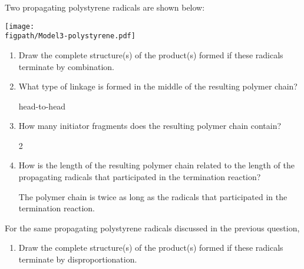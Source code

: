 \begin{activity}
\begin{ctqs}
	\question Two propagating polystyrene radicals are shown below:
	
			\centerline{\texttt{[image: \\figpath/Model3-polystyrene.pdf]}}
	
		\begin{enumerate}
			\item Draw the complete structure(s) of the product(s) formed if these radicals terminate by combination.
	
				\begin{solution}[1.25in]\end{solution}
			
			\item What type of linkage is formed in the middle of the resulting polymer chain?
	
				\begin{solution}[0.25in]
					head-to-head
				\end{solution}
			
			\item How many initiator fragments does the resulting polymer chain contain?
	
				\begin{solution}[0.25in]
					2
				\end{solution}
			
			\item How is the length of the resulting polymer chain related to the length of the propagating radicals that participated in the termination reaction?
	
				\begin{solution}[0.5in]
					The polymer chain is twice as long as the radicals that participated in the termination reaction.
				\end{solution}
				
		\end{enumerate}
		
	\question For the same propagating polystyrene radicals discussed in the previous question,
	
		\begin{enumerate}
			\item Draw the complete structure(s) of the product(s) formed if these radicals terminate by disproportionation.
	
				\begin{solution}[1.5in]\end{solution}
			

\end{enumerate}
\end{ctqs}
\end{activity}

